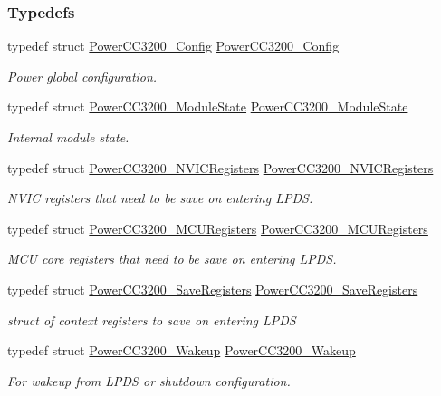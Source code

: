 \subsubsection*{Typedefs}
\begin{DoxyCompactItemize}
\item 
typedef struct \hyperlink{struct_power_c_c3200___config}{Power\+C\+C3200\+\_\+\+Config} \hyperlink{_power_c_c3200_8h_a8d9ee7af05855422ec151cc9b8e9849e}{Power\+C\+C3200\+\_\+\+Config}
\begin{DoxyCompactList}\small\item\em Power global configuration. \end{DoxyCompactList}\item 
typedef struct \hyperlink{struct_power_c_c3200___module_state}{Power\+C\+C3200\+\_\+\+Module\+State} \hyperlink{_power_c_c3200_8h_a2be0d315e9ddaa43c44b5eb74380bc0f}{Power\+C\+C3200\+\_\+\+Module\+State}
\begin{DoxyCompactList}\small\item\em Internal module state. \end{DoxyCompactList}\item 
typedef struct \hyperlink{struct_power_c_c3200___n_v_i_c_registers}{Power\+C\+C3200\+\_\+\+N\+V\+I\+C\+Registers} \hyperlink{_power_c_c3200_8h_adff2d0c1a54df8093e4694270772b923}{Power\+C\+C3200\+\_\+\+N\+V\+I\+C\+Registers}
\begin{DoxyCompactList}\small\item\em N\+V\+I\+C registers that need to be save on entering L\+P\+D\+S. \end{DoxyCompactList}\item 
typedef struct \hyperlink{struct_power_c_c3200___m_c_u_registers}{Power\+C\+C3200\+\_\+\+M\+C\+U\+Registers} \hyperlink{_power_c_c3200_8h_a54b9b60b75777323cdc7aa77f8ce3dc9}{Power\+C\+C3200\+\_\+\+M\+C\+U\+Registers}
\begin{DoxyCompactList}\small\item\em M\+C\+U core registers that need to be save on entering L\+P\+D\+S. \end{DoxyCompactList}\item 
typedef struct \hyperlink{struct_power_c_c3200___save_registers}{Power\+C\+C3200\+\_\+\+Save\+Registers} \hyperlink{_power_c_c3200_8h_ae00332cfff6e10261b4b394a02ac20e3}{Power\+C\+C3200\+\_\+\+Save\+Registers}
\begin{DoxyCompactList}\small\item\em struct of context registers to save on entering L\+P\+D\+S \end{DoxyCompactList}\item 
typedef struct \hyperlink{struct_power_c_c3200___wakeup}{Power\+C\+C3200\+\_\+\+Wakeup} \hyperlink{_power_c_c3200_8h_ade61871ecf51dcb5694c9b572d1e49dc}{Power\+C\+C3200\+\_\+\+Wakeup}
\begin{DoxyCompactList}\small\item\em For wakeup from L\+P\+D\+S or shutdown configuration. \end{DoxyCompactList}\end{DoxyCompactItemize}
